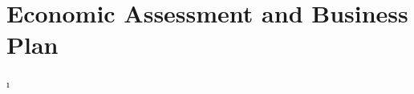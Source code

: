 \chapter{Economic Assessment and Business Plan}
\label{sec:economics}

\begin{refsection}

\localtableofcontents
\newpage













\clearpage
\printbibliography[heading=subbibintoc]

\begin{subappendices}
    
    
    
    \i
    
\end{subappendices}

\end{refsection}
